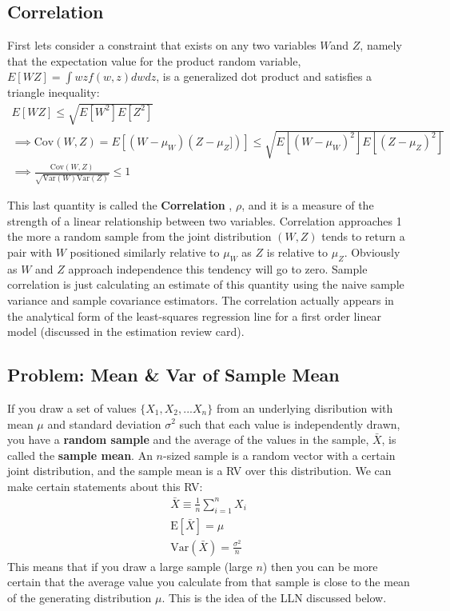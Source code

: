 \subsection{Correlation}
First lets consider a constraint that exists on any two variables $W$and $Z$, namely that the expectation value for the product random variable, $E[WZ] = \int{wzf(w,z)dwdz}$, is a generalized dot product and satisfies a triangle inequality: 
\begin{align*}
E[WZ] \leq \sqrt{E[W^2]E[Z^2]} \\
\implies \mathrm{Cov}(W,Z) = E[(W-\mu_W)(Z-\mu_Z])] \leq \sqrt{E[(W-\mu_W)^2]E[(Z-\mu_Z)^2]}\\
\implies \frac{\mathrm{Cov}(W, Z)}{\sqrt{\mathrm{Var}(W)\mathrm{Var}(Z)}} \leq 1
\end{align*}

This last quantity is called the \textbf{Correlation }, $\rho$, and it is a measure of the strength of a linear relationship between two variables. Correlation approaches 1 the more a random sample from the joint distribution $(W, Z)$ tends to return a pair with $W$ positioned similarly relative to $\mu_W$ as $Z$ is relative to $\mu_Z$. Obviously as $W$ and $Z$ approach independence this tendency will go to zero. Sample correlation is just calculating an estimate of this quantity using the naive sample variance and sample covariance estimators. The correlation actually appears in the analytical form of the least-squares regression line for a first order linear model (discussed in the estimation review card).

\subsection{Problem: Mean \& Var of Sample Mean}
If you draw a set of values $\{X_1, X_2,... X_n\}$  from an underlying disribution with mean $\mu$ and standard deviation $\sigma^2$ such that each value is independently drawn, you have a \textbf{random sample} and the average of the values in the sample, $\bar{X}$, is called the \textbf{sample mean}. An $n$-sized sample is a random vector with a certain joint distribution, and the sample mean is a RV over this distribution. We can make certain statements about this RV:
\begin{align}
\bar{X} \equiv \frac{1}{n}\sum_{i=1}^n X_i\\
\mathrm{E}[\bar{X}] = \mu\\
\mathrm{Var}(\bar{X}) = \frac{\sigma^2}{n}
\end{align}
This means that if you draw a large sample (large $n$) then you can be more certain that the average value you calculate from that sample is close to the mean of the generating distribution $\mu$. This is the idea of the LLN discussed below.



